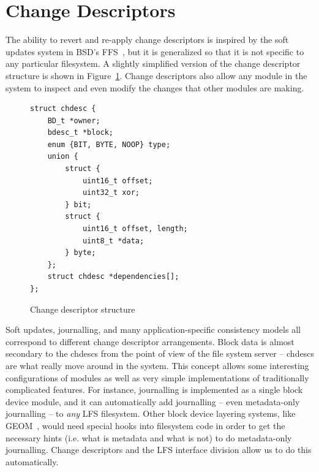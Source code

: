 \preparagraphspacing{}
\section*{Change Descriptors}
\label{sec:chdescs}


The ability to revert and re-apply change descriptors is inspired by the soft
updates system in BSD's FFS~\cite{ganger00soft}, but it is generalized so that
it is not specific to any particular filesystem. A slightly simplified version
of the change descriptor structure is shown in Figure~\ref{fig:chdesc}. Change
descriptors also allow any module in the system to inspect and even modify the
changes that other modules are making.

\begin{figure}
\begin{verbatim}
struct chdesc {
    BD_t *owner;
    bdesc_t *block;
    enum {BIT, BYTE, NOOP} type;
    union {
        struct {
            uint16_t offset;
            uint32_t xor;
        } bit;
        struct {
            uint16_t offset, length;
            uint8_t *data;
        } byte;
    };
    struct chdesc *dependencies[];
};
\end{verbatim}
\vspace{-12pt}
\caption{\label{fig:chdesc} Change descriptor structure}
\end{figure}


Soft updates, journalling, and many application-specific consistency models all
correspond to different change descriptor arrangements.
%
Block data is almost secondary to the chdescs from the point of view of the file
system server -- chdescs are what really move around in the system.
%
This concept allows some interesting configurations of
modules as well as very simple implementations of traditionally complicated
features. For instance, journalling is implemented as a single block device
module, and it can automatically add journalling -- even metadata-only
journalling -- to {\it any} LFS filesystem. Other block device layering systems,
like GEOM~\cite{geom}, would need special hooks into filesystem code in order to
get the necessary hints (i.e. what is metadata and what is not) to do
metadata-only journalling. Change descriptors and the LFS interface division
allow us to do this automatically.

